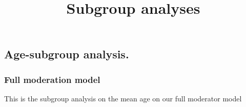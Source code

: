 \documentclass[
  letterpaper,
  DIV=11,
  numbers=noendperiod]{scrartcl}
\title{Subgroup analyses}
\author{}
\date{}
\begin{document}
\maketitle
\ifdefined\Shaded\renewenvironment{Shaded}{\begin{tcolorbox}[frame hidden, interior hidden, boxrule=0pt, borderline west={3pt}{0pt}{shadecolor}, enhanced, breakable, sharp corners]}{\end{tcolorbox}}\fi

\hypertarget{age-subgroup-analysis.}{%
\subsection{Age-subgroup analysis.}\label{age-subgroup-analysis.}}

\hypertarget{full-moderation-model}{%
\subsubsection{Full moderation model}\label{full-moderation-model}}

This is the subgroup analysis on the mean age on our full moderator
model
\end{document}
